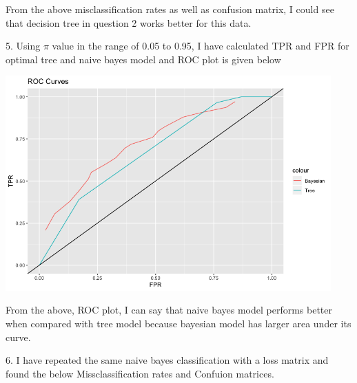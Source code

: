 \documentclass[a4paper,10pt]{article}
\begin{document}
From the above misclassification rates as well as confusion matrix, I could see that decision tree in question 2 works better for this data. \par
\vspace{0.5cm}
5. Using $\pi$ value in the range of 0.05 to 0.95, I have calculated TPR and FPR for optimal tree and naive bayes model and ROC plot is given below \par
\begin{center}
  \includegraphics[width=125mm,scale=0.10]{ROC_AUC_Curve.png} 
\end{center}
From the above, ROC plot, I can say that naive bayes model performs better when compared with tree model because bayesian model has larger area under its curve.
\par
\vspace{0.5cm}
6. I have repeated the same naive bayes classification with a loss matrix and found the below Missclassification rates and Confuion matrices.\par
\end{document}
